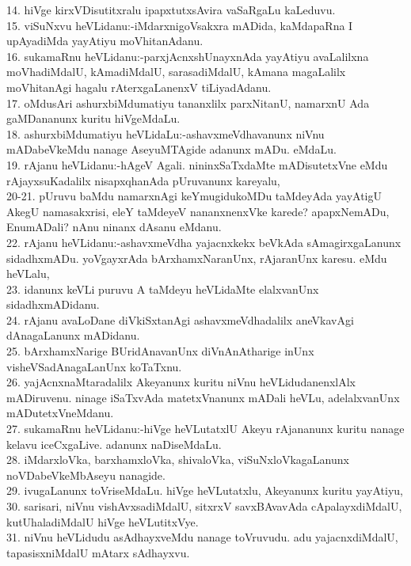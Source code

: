 \documentclass{article}
\begin{document}
14. hiVge kirxVDisutitxralu ipapxtutxsAvira vaSaRgaLu kaLeduvu.\\
15. viSuNxvu heVLidanu:-iMdarxnigoVsakxra mADida, kaMdapaRna I upAyadiMda yayAtiyu moVhitanAdanu.\\
16. sukamaRnu heVLidanu:-parxjAcnxshUnayxnAda yayAtiyu avaLalilxna moVhadiMdalU, kAmadiMdalU, sarasadiMdalU, kAmana magaLalilx moVhitanAgi hagalu rAterxgaLanenxV tiLiyadAdanu.\\
17. oMdusAri ashurxbiMdumatiyu tananxlilx parxNitanU, namarxnU Ada gaMDananunx kuritu hiVgeMdaLu.\\
18. ashurxbiMdumatiyu heVLidaLu:-ashavxmeVdhavanunx niVnu mADabeVkeMdu nanage AseyuMTAgide adanunx mADu. eMdaLu.\\
19. rAjanu heVLidanu:-hAgeV Agali. nininxSaTxdaMte mADisutetxVne eMdu rAjayxsuKadalilx nisapxqhanAda pUruvanunx kareyalu,\\
20-21. pUruvu baMdu namarxnAgi keYmugidukoMDu taMdeyAda yayAtigU AkegU namasakxrisi, eleY taMdeyeV nananxnenxVke karede? apapxNemADu, EnumADali? nAnu ninanx dAsanu eMdanu.\\
22. rAjanu heVLidanu:-ashavxmeVdha yajacnxkekx beVkAda sAmagirxgaLanunx sidadhxmADu. yoVgayxrAda bArxhamxNaranUnx, rAjaranUnx karesu. eMdu heVLalu,\\
23. idanunx keVLi puruvu A taMdeyu heVLidaMte elalxvanUnx sidadhxmADidanu.\\
24. rAjanu avaLoDane diVkiSxtanAgi ashavxmeVdhadalilx aneVkavAgi dAnagaLanunx mADidanu.\\
25. bArxhamxNarige BUridAnavanUnx diVnAnAtharige inUnx visheVSadAnagaLanUnx koTaTxnu.\\
26. yajAcnxnaMtaradalilx Akeyanunx kuritu niVnu heVLidudanenxlAlx mADiruvenu. ninage iSaTxvAda matetxVnanunx mADali heVLu, adelalxvanUnx mADutetxVneMdanu.\\
27. sukamaRnu heVLidanu:-hiVge heVLutatxlU Akeyu rAjananunx kuritu nanage kelavu iceCxgaLive. adanunx naDiseMdaLu.\\
28. iMdarxloVka, barxhamxloVka, shivaloVka, viSuNxloVkagaLanunx noVDabeVkeMbAseyu nanagide.\\
29. ivugaLanunx toVriseMdaLu. hiVge heVLutatxlu, Akeyanunx kuritu yayAtiyu,\\
30. sarisari, niVnu vishAvxsadiMdalU, sitxrxV savxBAvavAda cApalayxdiMdalU, kutUhaladiMdalU hiVge heVLutitxVye.\\
31. niVnu heVLidudu asAdhayxveMdu nanage toVruvudu. adu yajacnxdiMdalU, tapasisxniMdalU mAtarx sAdhayxvu.\\
\end{document}
